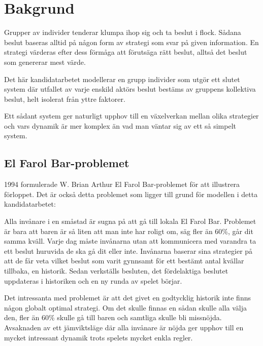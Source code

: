 \section{Bakgrund}


Grupper av individer tenderar klumpa ihop sig och ta beslut i flock. Sådana beslut baseras alltid på någon form av strategi som svar på given information. En strategi värderas efter dess förmåga att förutsäga rätt beslut, alltså det beslut som genererar mest värde. 

Det här kandidatarbetet modellerar en grupp individer som utgör ett slutet system där utfallet av varje enskild aktörs beslut bestäms av gruppens kollektiva beslut, helt isolerat från yttre faktorer.

Ett sådant system ger naturligt upphov till en växelverkan mellan olika strategier och vars dynamik är mer komplex än vad man väntar sig av ett så simpelt system.

\subsection{El Farol Bar-problemet}

1994 formulerade W. Brian Arthur El Farol Bar-problemet för att illustrera förloppet. Det är också detta problemet som ligger till grund för modellen i detta kandidatarbetet:

Alla invånare i en småstad är sugna på att gå till lokala El Farol Bar. Problemet är bara att baren är så liten att man inte har roligt om, säg fler än 60\%, går dit samma kväll. Varje dag måste invånarna utan att kommunicera med varandra ta ett beslut huruvida de ska gå dit eller inte. Invånarna baserar sina strategier på att de får veta vilket beslut som varit gynnsamt för ett bestämt antal kvällar tillbaka, en historik. Sedan verkställs besluten, det fördelaktiga beslutet uppdateras i historiken och en ny runda av spelet börjar.

Det intressanta med problemet är att det givet en godtycklig historik inte finns någon globalt optimal strategi. Om det skulle finnas en sådan skulle alla välja den, fler än 60\% skulle gå till baren och samtliga skulle bli missnöjda. Avsaknaden av ett jämviktsläge där alla invånare är nöjda ger upphov till en mycket intressant dynamik trots spelets mycket enkla regler.


